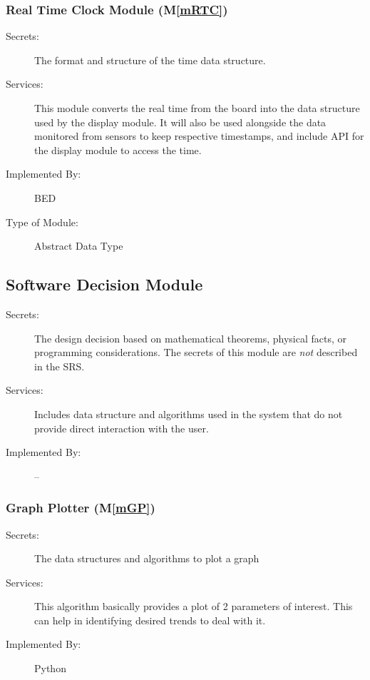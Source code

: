 \documentclass[12pt, titlepage]{article}
\newcommand{\mref}[1]{M\ref{#1}}
\begin{document}
\subsubsection{Real Time Clock Module (\mref{mRTC})}

\begin{description}
  \item[Secrets:]The format and structure of the time data structure.
  \item[Services:] This module converts the real time from the board into the data structure used by the
    display module. It will also be used alongside the data monitored from sensors to keep respective timestamps, and include API for the display module to access the time.
  \item[Implemented By:] BED
  \item[Type of Module:] Abstract Data Type
\end{description}


\subsection{Software Decision Module}

\begin{description}
  \item[Secrets:] The design decision based on mathematical theorems, physical
    facts, or programming considerations. The secrets of this module are
    \emph{not} described in the SRS.
  \item[Services:] Includes data structure and algorithms used in the system that
    do not provide direct interaction with the user.
  \item[Implemented By:] --
\end{description}

\subsubsection{Graph Plotter (\mref{mGP})}

\begin{description}
  \item[Secrets:] The data structures and algorithms to plot a graph
  \item[Services:] This algorithm basically provides a plot of 2 parameters of interest. This can help in identifying desired trends to deal with it.
  \item[Implemented By:] Python
\end{description}
\end{document}
